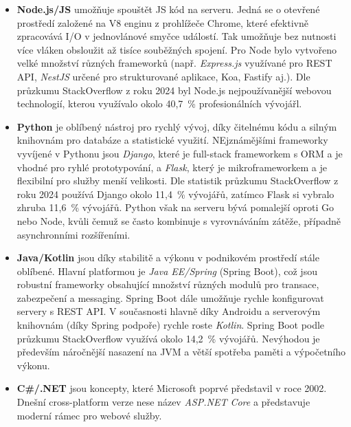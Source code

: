 \begin{itemize}
    \item \textbf{Node.js/JS} umožňuje spouštět JS kód na serveru.
        Jedná se o otevřené prostředí založené na V8 enginu z prohlížeče
        Chrome, které efektivně zpracovává I/O v jednovlánové smyčce
        událostí. %
        Tak umožňuje bez nutnosti více vláken obsloužit až tisíce
        souběžných spojení. Pro Node bylo vytvořeno velké množství
        různých frameworků (např. \emph{Express.js} využívané pro REST API,
        \emph{NestJS} určené pro strukturované aplikace, Koa, Fastify aj.).
        Dle průzkumu StackOverflow z roku 2024 byl Node.js nejpoužívanější
        webovou technologií, kterou využívalo okolo 40,7~\% profesionálních
        vývojářl. %
    \item \textbf{Python} je oblíbený nástroj pro rychlý vývoj, díky
        čitelnému kódu a silným knihovnám pro databáze a statistické
        využití. NEjznámějšími frameworky vyvíjené v Pythonu jsou
        \emph{Django}, které je full-stack frameworkem s ORM a je vhodné
        pro ryhlé prototypování, a \emph{Flask}, který je mikroframeworkem
        a je flexibilní pro služby menší velikosti. Dle statistik průzkumu
        StackOverflow z roku 2024 používá Django okolo 11,4~\% vývojářů,
        zatímco Flask si vybralo zhruba 11,6~\% vývojářů. %
        Python však na serveru bývá pomalejší oproti Go nebo Node, kvůli
        čemuž se často kombinuje s vyrovnáváním zátěže, případně
        asynchronními rozšířeními.
    \item \textbf{Java/Kotlin} jsou díky stabilitě a výkonu v podnikovém
        prostředí stále oblíbené. Hlavní platformou je \emph{Java EE/Spring}
        (Spring Boot), což jsou robustní frameworky obsahující množství
        různých modulů pro transace, zabezpečení a messaging. Spring Boot
        dále umožňuje rychle konfigurovat servery s REST API. V současnosti
        hlavně díky Androidu a serverovým knihovnám (díky Spring podpoře)
        rychle roste \emph{Kotlin}. Spring Boot podle průzkumu StackOverflow
        využívá okolo 14,2~\% vývojářů. %
        Nevýhodou je především náročnější nasazení na JVM a větší spotřeba
        paměti a výpočetního výkonu.
    \item \textbf{C\#/.NET} jsou koncepty, které Microsoft poprvé
        představil v roce 2002. Dnešní cross-platform verze nese název
        \emph{ASP.NET Core} a představuje moderní rámec pro webové služby.

\end{itemize}
